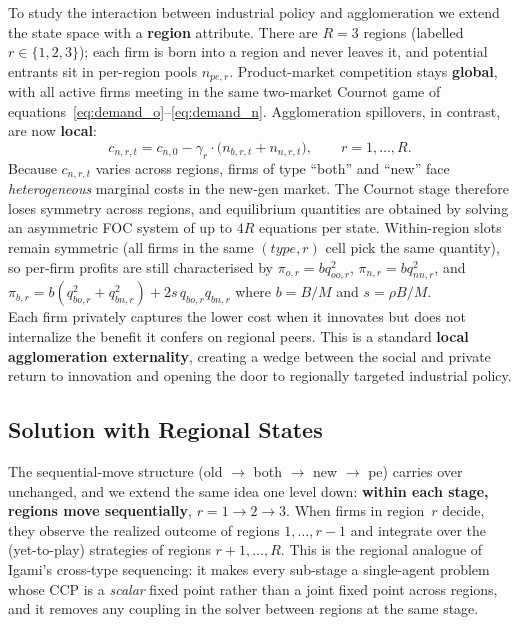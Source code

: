 \documentclass[12pt]{article}
\begin{document}
To study the interaction between industrial policy and agglomeration we
extend the state space with a \textbf{region} attribute. There are $R = 3$
regions (labelled $r \in \{1,2,3\}$); each firm is born into a region and
never leaves it, and potential entrants sit in per-region pools $n_{pe,r}$.
Product-market competition stays \textbf{global}, with all active firms
meeting in the same two-market Cournot game of
equations~\eqref{eq:demand_o}--\eqref{eq:demand_n}. Agglomeration spillovers,
in contrast, are now \textbf{local}:
\begin{equation}
  c_{n,r,t} = c_{n,0} - \gamma_r \cdot \bigl(n_{b,r,t} + n_{n,r,t}\bigr),
  \qquad r = 1,\dots,R.
  \label{eq:local_agglom}
\end{equation}
Because $c_{n,r,t}$ varies across regions, firms of type ``both'' and
``new'' face \emph{heterogeneous} marginal costs in the new-gen market. The
Cournot stage therefore loses symmetry across regions, and equilibrium
quantities are obtained by solving an asymmetric FOC system of up to $4R$
equations per state. Within-region slots remain symmetric (all firms in the
same $(type, r)$ cell pick the same quantity), so per-firm profits are still
characterised by $\pi_{o,r} = b q_{oo,r}^2$, $\pi_{n,r} = b q_{nn,r}^2$, and
$\pi_{b,r} = b(q_{bo,r}^2 + q_{bn,r}^2) + 2 s\, q_{bo,r} q_{bn,r}$ where
$b = B/M$ and $s = \rho B/M$.\\

Each firm privately captures the lower cost when it innovates but does not
internalize the benefit it confers on regional peers. This is a standard
\textbf{local agglomeration externality}, creating a wedge between the
social and private return to innovation and opening the door to regionally
targeted industrial policy.

\subsection{Solution with Regional States}

The sequential-move structure (old $\to$ both $\to$ new $\to$ pe) carries
over unchanged, and we extend the same idea one level down: \textbf{within
each stage, regions move sequentially}, $r = 1 \to 2 \to 3$. When firms in
region~$r$ decide, they observe the realized outcome of regions
$1,\dots,r-1$ and integrate over the (yet-to-play) strategies of regions
$r+1,\dots,R$. This is the regional analogue of Igami's cross-type
sequencing: it makes every sub-stage a single-agent problem whose CCP is a
\emph{scalar} fixed point rather than a joint fixed point across regions,
and it removes any coupling in the solver between regions at the same
stage.\\
\end{document}

